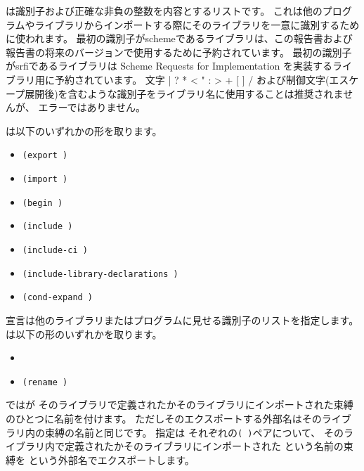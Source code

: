 は識別子および正確な非負の整数を内容とするリストです。
これは他のプログラムやライブラリからインポートする際にそのライブラリを一意に識別するために使われます。
最初の識別子が{\cf scheme}であるライブラリは、この報告書および報告書の将来のバージョンで使用するために予約されています。
最初の識別子が{\cf srfi}であるライブラリは Scheme Requests for Implementation を実装するライブラリ用に予約されています。
文字 {\cf | \backwhack{} ? * < " : > + [ ] /}
および制御文字(エスケープ展開後)を含むような識別子をライブラリ名に使用することは推奨されませんが、
エラーではありません。

\label{librarydeclarations}
は以下のいずれかの形を取ります。

\begin{itemize}

\item{\tt(export  \dotsfoo)}

\item{\tt(import  \dotsfoo)}

\item{\tt(begin  \dotsfoo)}

\item{\tt(include   \dotsfoo)}

\item{\tt(include-ci   \dotsfoo)}

\item{\tt(include-library-declarations   \dotsfoo)}

\item{\tt(cond-expand   \dotsfoo)}

\end{itemize}

宣言は他のライブラリまたはプログラムに見せる識別子のリストを指定します。
は以下の形のいずれかを取ります。

\begin{itemize}
\item{}
\item{\tt{(rename  )}}
\end{itemize}

ではが
そのライブラリで定義されたかそのライブラリにインポートされた束縛のひとつに名前を付けます。
ただしそのエクスポートする外部名はそのライブラリ内の束縛の名前と同じです。
指定は
それぞれの{\tt( )}ペアについて、
そのライブラリ内で定義されたかそのライブラリにインポートされた
という名前の束縛を
という外部名でエクスポートします。

